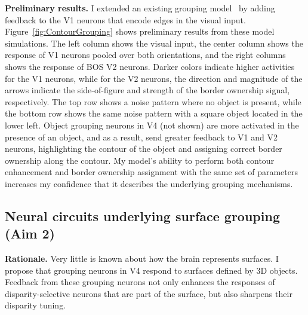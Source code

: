 \documentclass[11pt]{article}
\begin{document}
\textbf{Preliminary results.} I extended an existing grouping model~\citep{Mihalas_etal11b} by adding feedback to the V1 neurons that encode edges in the visual input. Figure~\ref{fig:ContourGrouping} shows preliminary results from these model simulations. 
The left column shows the visual
input, the center column shows the response of V1 neurons pooled
over both orientations, and the right columns shows the response of BOS V2 neurons. Darker colors indicate higher activities for the V1 neurons, while for the V2 neurons, the direction and magnitude of the arrows indicate the side-of-figure and strength of the border ownership signal, respectively.
The top row shows a noise pattern where no object is
present, while the bottom row shows the same noise pattern with a
square object located in the lower left. Object grouping neurons in V4
(not shown)
are more activated in the presence of an object, and as a result, send
greater feedback to V1 and V2 neurons, highlighting the contour of the
object and assigning correct border ownership along the contour.
My model's ability to perform both contour enhancement and border ownership assignment with the same set of parameters increases my confidence that it describes the underlying grouping mechanisms.


\subsection{Neural circuits underlying surface grouping (Aim 2)} 
\textbf{Rationale.} Very little is known about how the brain 
represents
surfaces.
I propose that
grouping neurons in V4 respond to surfaces defined by 3D
objects. Feedback from these grouping neurons not only enhances the
responses of disparity-selective neurons that are part of the surface,
but also sharpens their disparity tuning.
 
\end{document}
